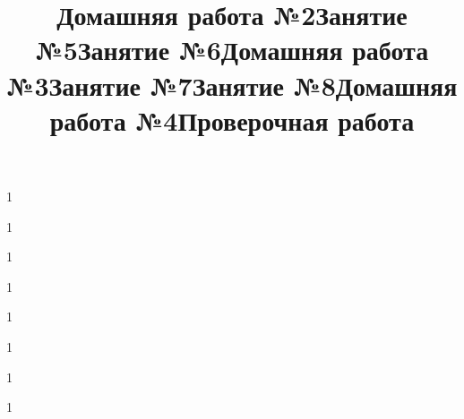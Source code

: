 \title{Домашняя работа №2}
\begin{listofex}
	\item 1
	
\end{listofex}
\newpage
\title{Занятие №5}
\begin{listofex}
	\item 1
	
\end{listofex}
\newpage
\title{Занятие №6}
\begin{listofex}
	\item 1
	
\end{listofex}
\newpage
\title{Домашняя работа №3}
\begin{listofex}
	\item 1
	
\end{listofex}
\newpage
\title{Занятие №7}
\begin{listofex}
	\item 1
	
\end{listofex}
\newpage
\title{Занятие №8}
\begin{listofex}
	\item 1
	
\end{listofex}
\newpage
\title{Домашняя работа №4}
\begin{listofex}
	\item 1
	
\end{listofex}
\newpage
\title{Проверочная работа}
\begin{listofex}
	\item 1
	
\end{listofex}